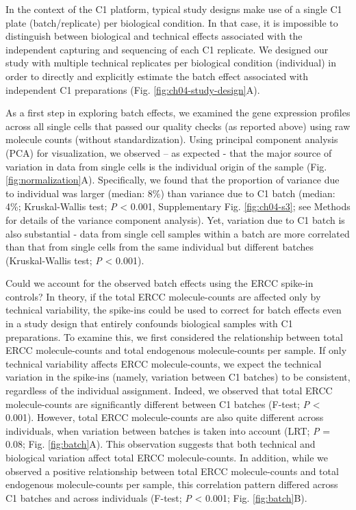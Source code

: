 In the context of the C1 platform, typical study designs make use of a
single C1 plate (batch/replicate) per biological condition. In that
case, it is impossible to distinguish between biological and technical
effects associated with the independent capturing and sequencing of each
C1 replicate. We designed our study with multiple technical replicates
per biological condition (individual) in order to directly and
explicitly estimate the batch effect associated with independent C1
preparations (Fig. \ref{fig:ch04-study-design}A).

As a first step in exploring batch effects, we examined the gene
expression profiles across all single cells that passed our quality
checks (as reported above) using raw molecule counts (without
standardization). Using principal component analysis (PCA) for
visualization, we observed -- as expected - that the major source of
variation in data from single cells is the individual origin of the
sample (Fig. \ref{fig:normalization}A). Specifically, we found that the proportion of variance
due to individual was larger (median: 8\%) than variance due to C1 batch
(median: 4\%; Kruskal-Wallis test; \emph{P} \textless{} 0.001,
Supplementary Fig. \ref{fig:ch04-s3}; see Methods for details of the variance component
analysis). Yet, variation due to C1 batch is also substantial - data
from single cell samples within a batch are more correlated than that
from single cells from the same individual but different batches
(Kruskal-Wallis test; \emph{P} \textless{} 0.001).

Could we account for the observed batch effects using the ERCC spike-in
controls? In theory, if the total ERCC molecule-counts are affected only
by technical variability, the spike-ins could be used to correct for
batch effects even in a study design that entirely confounds biological
samples with C1 preparations. To examine this, we first considered the
relationship between total ERCC molecule-counts and total endogenous
molecule-counts per sample. If only technical variability affects ERCC
molecule-counts, we expect the technical variation in the spike-ins
(namely, variation between C1 batches) to be consistent, regardless of
the individual assignment. Indeed, we observed that total ERCC
molecule-counts are significantly different between C1 batches (F-test;
\emph{P} \textless{} 0.001). However, total ERCC molecule-counts are
also quite different across individuals, when variation between batches
is taken into account (LRT; \emph{P} = 0.08; Fig. \ref{fig:batch}A). This observation
suggests that both technical and biological variation affect total ERCC
molecule-counts. In addition, while we observed a positive relationship
between total ERCC molecule-counts and total endogenous molecule-counts
per sample, this correlation pattern differed across C1 batches and
across individuals (F-test; \emph{P} \textless{} 0.001; Fig. \ref{fig:batch}B).

